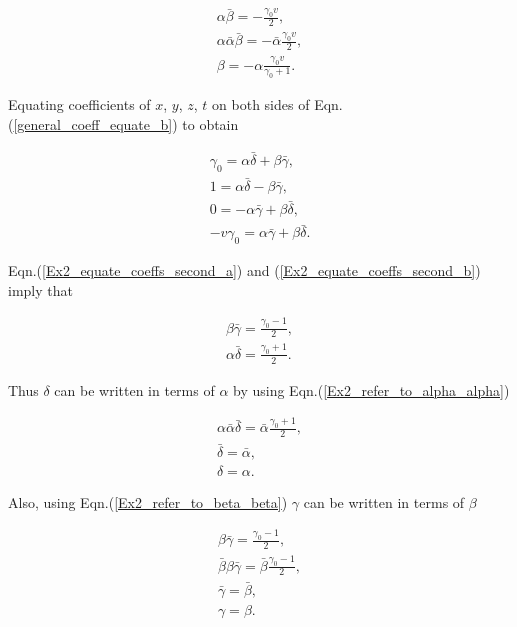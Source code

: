 \begin{gather*}
\alpha \bar{\beta} = -\frac{\gamma_0 v}{2}, \\
\alpha \bar{\alpha} \bar{\beta} = - \bar{\alpha} \frac{\gamma_0 v}{2}, \\
\beta = -\alpha \frac{\gamma_0 v}{\gamma_0 + 1}.
\end{gather*}

\noindent Equating coefficients of $x$, $y$, $z$, $t$ on both sides of Eqn.(\ref{general_coeff_equate_b}) to obtain

\begin{subequations}
\begin{gather}\label{Ex2_equate_coeffs_second_a}
\gamma_0 = \alpha \bar{\delta} + \beta\bar{\gamma}, \\\label{Ex2_equate_coeffs_second_b}
1 = \alpha \bar{\delta} - \beta\bar{\gamma},\\\label{Ex2_equate_coeffs_second_c}
0 = -\alpha\bar{\gamma} + \beta \bar{\delta},\\\label{Ex2_equate_coeffs_second_d}
-v\gamma_0 = \alpha\bar{\gamma} + \beta \bar{\delta}. 
\end{gather}
\end{subequations}

\noindent Eqn.(\ref{Ex2_equate_coeffs_second_a}) and (\ref{Ex2_equate_coeffs_second_b}) imply that

\begin{align*}
\beta \bar{\gamma} = \frac{\gamma_0 - 1}{2}, \\
\alpha \bar{\delta} = \frac{\gamma_0 + 1}{2}.
\end{align*}

Thus $\delta$ can be written in terms of $\alpha$ by using Eqn.(\ref{Ex2_refer_to_alpha_alpha})

\begin{gather*}
\alpha \bar{\alpha} \bar{\delta} = \bar{\alpha} \frac{\gamma_0 + 1}{2}, \\
\bar{\delta} = \bar{\alpha}, \\
\delta = \alpha. 
\end{gather*}

Also, using Eqn.(\ref{Ex2_refer_to_beta_beta}) $\gamma$ can be written in terms of $\beta$

\begin{gather*}
\beta \bar{\gamma} = \frac{\gamma_0 - 1}{2},\\
\bar{\beta} \beta \bar{\gamma} = \bar{\beta} \frac{\gamma_0 - 1}{2},\\
\bar{\gamma} = \bar{\beta}, \\
\gamma = \beta.
\end{gather*}

